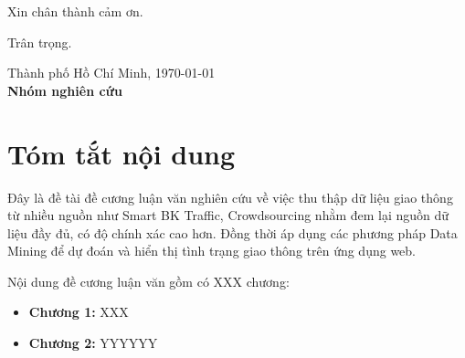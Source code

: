 \documentclass[
11pt, %
english,%
singlespacing, %
parskip, %
headsepline, %
]{MastersDoctoralThesis} %
\begin{document}
Xin chân thành cảm ơn.

Trân trọng.\\[1cm]

\begin{minipage}[t]{0.4\textwidth}
\hspace*{1cm}
\end{minipage}
\begin{minipage}[t]{0.6\textwidth}
\begin{center}
Thành phố Hồ Chí Minh, \today\\
\textbf{Nhóm nghiên cứu}
\end{center}
\end{minipage}


\chapter{Tóm tắt nội dung}
Đây là đề tài đề cương luận văn nghiên cứu về việc thu thập dữ liệu giao thông từ nhiều nguồn như Smart BK Traffic, Crowdsourcing nhằm đem lại nguồn dữ liệu đầy đủ, có độ chính xác cao hơn. Đồng thời áp dụng các phương pháp Data Mining để dự đoán và hiển thị tình trạng giao thông trên ứng dụng web.

Nội dung đề cương luận văn gồm có XXX chương:
\begin{itemize}
\item \textbf{Chương 1:} XXX
\item \textbf{Chương 2:} YYYYYY
\end{itemize}




\tableofcontents %

\listoffigures %

\listoftables %
\end{document}
